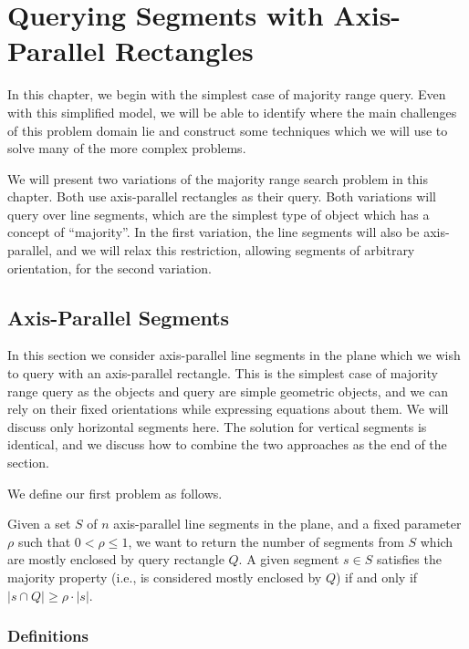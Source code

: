 \chapter{Querying Segments with Axis-Parallel Rectangles}
\label{:rectangles}

In this chapter, we begin with the simplest case of majority range query.  Even with this simplified model, we will be able to identify where the main challenges of this problem domain lie and construct some techniques which we will use to solve many of the more complex problems.

We will present two variations of the majority range search problem in this chapter. Both use axis-parallel rectangles as their query. Both variations will query over line segments, which are the simplest type of object which has a concept of ``majority''.  In the first variation, the line segments will also be axis-parallel, and we will relax this restriction, allowing segments of arbitrary orientation, for the second variation.

\section{Axis-Parallel Segments}
\label{:rectangles:ap}

In this section we consider axis-parallel line segments in the plane which we wish to query with an axis-parallel rectangle.  This is the simplest case of majority range query as the objects and query are simple geometric objects, and we can rely on their fixed orientations while expressing equations about them. 
We will discuss only horizontal segments here.  The solution for vertical segments is identical, and we discuss how to combine the two approaches as the end of the section.

We define our first problem as follows.

\begin{problem}
Given a set $S$ of $n$ axis-parallel line segments in the plane, and a fixed parameter $\rho$ such that $0 < \rho \leq 1$, we want to return the number of segments from $S$ which are mostly enclosed by query rectangle $Q$. A given segment $s \in S$ satisfies the majority property (i.e., is considered mostly enclosed by $Q$) if and only if $|s \cap Q| \geq \rho \cdot |s|$.
\end{problem}


\subsection{Definitions}
\label{:rectangles:ap:defs}

